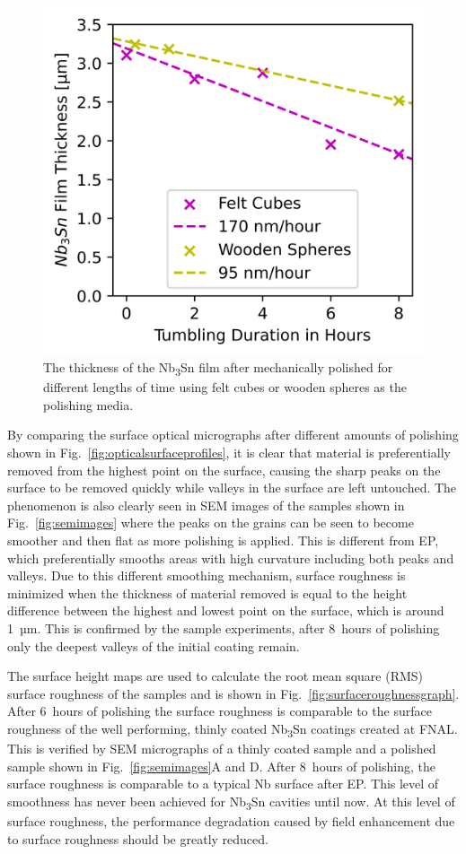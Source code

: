 \documentclass[reprint,amsmath,amssymb,aps]{revtex4-2}%
\begin{document}
\begin{figure}[t]%
\centering%
\includegraphics[width=0.8\columnwidth]{../doc/figs/Material_Removal_Graph.png}%
\caption{The thickness of the Nb\textsubscript{3}Sn film after mechanically polished for different lengths of time using felt cubes or wooden spheres as the polishing media.}%
\label{fig:materialremovalgraph}%
\end{figure}

By comparing the surface optical micrographs after different amounts of polishing shown in Fig.~\ref{fig:opticalsurfaceprofiles}, it is clear that material is preferentially removed from the highest point on the surface, causing the sharp peaks on the surface to be removed quickly while valleys in the surface are left untouched. The phenomenon is also clearly seen in SEM images of the samples shown in Fig.~\ref{fig:semimages} where the peaks on the grains can be seen to become smoother and then flat as more polishing is applied. This is different from EP, which preferentially smooths areas with high curvature including both peaks and valleys. Due to this different smoothing mechanism, surface roughness is minimized when the thickness of material removed is equal to the height difference between the highest and lowest point on the surface, which is around 1~µm. This is confirmed by the sample experiments, after 8~hours of polishing only the deepest valleys of the initial coating remain.

The surface height maps are used to calculate the root mean square (RMS) surface roughness of the samples and is shown in Fig.~\ref{fig:surfaceroughnessgraph}. After 6~hours of polishing the surface roughness is comparable to the surface roughness of the well performing, thinly coated Nb\textsubscript{3}Sn coatings created at FNAL\cite{posen2021advances}. This is verified by SEM micrographs of a thinly coated sample and a polished sample shown in Fig.~\ref{fig:semimages}A and D. After 8~hours of polishing, the surface roughness is comparable to a typical Nb surface after EP. This level of smoothness has never been achieved for Nb\textsubscript{3}Sn cavities until now. At this level of surface roughness, the performance degradation caused by field enhancement due to surface roughness should be greatly reduced.
\end{document}
